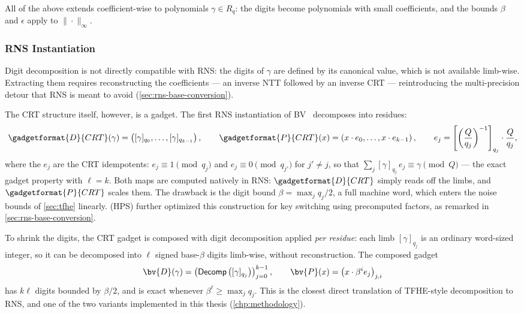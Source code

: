 All of the above extends coefficient-wise to polynomials $\gamma \in R_q$: the digits become polynomials with small coefficients, and the bounds $\beta$ and $\epsilon$ apply to $\|\cdot\|_\infty$.

\subsubsection{RNS Instantiation}
\label{sec:gadgets:rns}
Digit decomposition is not directly compatible with RNS: the digits of $\gamma$ are defined by its canonical value, which is not available limb-wise. Extracting them requires reconstructing the coefficients --- an inverse NTT followed by an inverse CRT --- reintroducing the multi-precision detour that RNS is meant to avoid (\autoref{sec:rns-base-conversion}).

The CRT structure itself, however, is a gadget. The first RNS instantiation of BV~\cite{cryptoeprint:2016/510} decomposes into residues:
\begin{equation}
    \label{eq:crt-gadget}
    \gadgetformat{D}{CRT}(\gamma) = \left([\gamma]_{q_0}, \dots, [\gamma]_{q_{k-1}}\right), \qquad
    \gadgetformat{P}{CRT}(x) = \left(x\cdot e_0, \dots, x\cdot e_{k-1}\right), \qquad
    e_j = \left[\left(\frac{Q}{q_j}\right)^{-1}\right]_{q_j}\cdot\frac{Q}{q_j},
\end{equation}
where the $e_j$ are the CRT idempotents: $e_j \equiv 1 \pmod{q_j}$ and $e_j \equiv 0 \pmod{q_{j'}}$ for $j' \neq j$, so that $\sum_j [\gamma]_{q_j}\, e_j \equiv \gamma \pmod{Q}$ --- the exact gadget property with $\ell = k$. Both maps are computed natively in RNS: $\gadgetformat{D}{CRT}$ simply reads off the limbs, and $\gadgetformat{P}{CRT}$ scales them. The drawback is the digit bound $\beta = \max_j q_j/2$, a full machine word, which enters the noise bounds of \autoref{sec:tfhe} linearly. \cite{cryptoeprint:2018/117} (HPS) further optimized this construction for key switching using precomputed factors, as remarked in \autoref{sec:rns-base-conversion}.

To shrink the digits, the CRT gadget is composed with digit decomposition applied \textit{per residue}: each limb $[\gamma]_{q_j}$ is an ordinary word-sized integer, so it can be decomposed into $\ell$ signed base-$\beta$ digits limb-wise, without reconstruction. The composed gadget
\begin{equation}
    \label{eq:bv-gadget}
    \bv{D}(\gamma) = \left(\mathsf{Decomp}\left([\gamma]_{q_j}\right)\right)_{j=0}^{k-1}, \qquad
    \bv{P}(x) = \left(x\cdot \beta^i e_j\right)_{j,i}
\end{equation}
has $k\ell$ digits bounded by $\beta/2$, and is exact whenever $\beta^\ell \geq \max_j q_j$. This is the closest direct translation of TFHE-style decomposition to RNS, and one of the two variants implemented in this thesis (\autoref{chp:methodology}).

